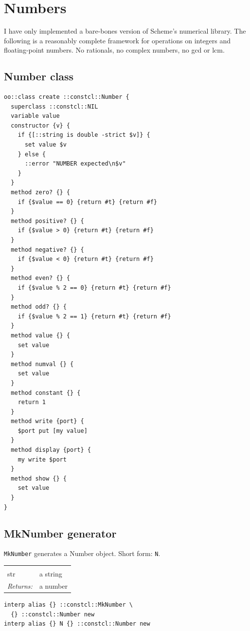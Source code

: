 \documentclass[twoside,9pt]{report}
\begin{document}
\section{Numbers}
\label{numbers}


I have only implemented a bare-bones version of Scheme's numerical library. The following is a reasonably complete framework for operations on integers and floating-point numbers. No rationals, no complex numbers, no gcd or lcm.

\subsection{Number class}
\label{number-class}
\begin{lstlisting}
oo::class create ::constcl::Number {
  superclass ::constcl::NIL
  variable value
  constructor {v} {
    if {[::string is double -strict $v]} {
      set value $v
    } else {
      ::error "NUMBER expected\n$v"
    }
  }
  method zero? {} {
    if {$value == 0} {return #t} {return #f}
  }
  method positive? {} {
    if {$value > 0} {return #t} {return #f}
  }
  method negative? {} {
    if {$value < 0} {return #t} {return #f}
  }
  method even? {} {
    if {$value % 2 == 0} {return #t} {return #f}
  }
  method odd? {} {
    if {$value % 2 == 1} {return #t} {return #f}
  }
  method value {} {
    set value
  }
  method numval {} {
    set value
  }
  method constant {} {
    return 1
  }
  method write {port} {
    $port put [my value]
  }
  method display {port} {
    my write $port
  }
  method show {} {
    set value
  }
}
\end{lstlisting}
\subsection{MkNumber generator}
\label{mknumber-generator}


\texttt{MkNumber} generates a Number object. Short form: \texttt{N}.

\noindent\begin{tabular}{ |p{1.9cm} p{8cm}| }
\hline
\rowcolor[HTML]{CCCCCC} \multicolumn{2}{|l|}{\bf MkNumber (internal)} \\
str & a string \\
\textit{Returns:} & a number \\
\hline
\end{tabular}
\begin{lstlisting}
interp alias {} ::constcl::MkNumber \
  {} ::constcl::Number new
interp alias {} N {} ::constcl::Number new
\end{lstlisting}
\end{document}
